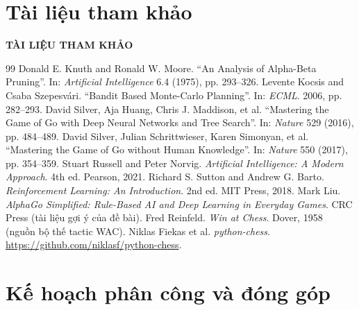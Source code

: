 \documentclass[13pt,a4paper]{extreport}
\newcommand{\chuong}[1]{\chapter*{#1}\addcontentsline{toc}{chapter}{#1}\markboth{}{}}
\newcommand{\tieude}[1]{\begin{center}\bfseries\Large\MakeUppercase{#1}\end{center}\vspace{0.6cm}}
\begin{document}
\chuong{Tài liệu tham khảo}
\tieude{Tài liệu tham khảo}
\begin{thebibliography}{99}\small
{} Donald E. Knuth and Ronald W. Moore. ``An Analysis of Alpha-Beta Pruning''. In: \emph{Artificial Intelligence} 6.4 (1975), pp. 293--326.
 Levente Kocsis and Csaba Szepesvári. ``Bandit Based Monte-Carlo Planning''. In: \emph{ECML}. 2006, pp. 282--293.
 David Silver, Aja Huang, Chris J. Maddison, et al. ``Mastering the Game of Go with Deep Neural Networks and Tree Search''. In: \emph{Nature} 529 (2016), pp. 484--489.
 David Silver, Julian Schrittwieser, Karen Simonyan, et al. ``Mastering the Game of Go without Human Knowledge''. In: \emph{Nature} 550 (2017), pp. 354--359.
 Stuart Russell and Peter Norvig. \emph{Artificial Intelligence: A Modern Approach}. 4th ed. Pearson, 2021.
 Richard S. Sutton and Andrew G. Barto. \emph{Reinforcement Learning: An Introduction}. 2nd ed. MIT Press, 2018.
 Mark Liu. \emph{AlphaGo Simplified: Rule-Based AI and Deep Learning in Everyday Games}. CRC Press (tài liệu gợi ý của đề bài).
 Fred Reinfeld. \emph{Win at Chess}. Dover, 1958 (nguồn bộ thế tactic WAC).
 Niklas Fiekas et al. \emph{python-chess}. \url{https://github.com/niklasf/python-chess}.
\end{thebibliography}

\appendix
\renewcommand{\chaptername}{Phụ lục}
\renewcommand{\thechapter}{\Alph{chapter}}
\chapter{Kế hoạch phân công và đóng góp}
\end{document}
